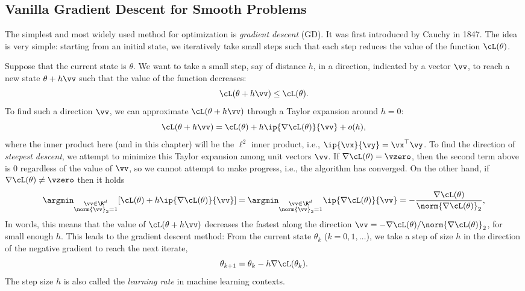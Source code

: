 \documentclass[../../book-main.tex]{subfiles}
\begin{document}
\subsection{Vanilla Gradient Descent for Smooth Problems}

The simplest and most widely used method for optimization is \textit{gradient descent} (GD). It was first introduced by Cauchy in 1847. The idea is very simple: starting from an initial state, we iteratively take small steps such that each step reduces the value of the function $\cL(\theta)$. 

Suppose that the current state is $\theta$. We want to take a small step, say of distance $h$, in a direction, indicated by a vector $\vv$, to reach a new state $\theta + h\vv$ such that the value of the function decreases:
\begin{equation}
    \cL(\theta + h\vv) \leq \cL(\theta).
\end{equation}
To find such a direction $\vv$, we can approximate $\cL(\theta + h\vv)$ through a Taylor expansion around \(h = 0\):
\begin{equation}
    \cL(\theta + h\vv) = \cL(\theta) + h\ip{\nabla \cL(\theta)}{\vv} + o(h),
\end{equation}
where the inner product here (and in this chapter) will be the \(\ell^{2}\) inner product, i.e., \(\ip{\vx}{\vy} = \vx^{\top}\vy\). To find the direction of \textit{steepest descent}, we attempt to minimize this Taylor expansion among unit vectors \(\vv\). If \(\nabla \cL(\theta) = \vzero\), then the second term above is \(0\) regardless of the value of \(\vv\), so we cannot attempt to make progress, i.e., the algorithm has converged. On the other hand, if \(\nabla \cL(\theta) \neq \vzero\) then it holds 
\begin{equation}\label{eq:steepest_descent_l2_norm}
    \argmin_{\substack{\vv \in \R^{d} \\ \norm{\vv}_{2} = 1}} [\cL(\theta) + h\ip{\nabla \cL(\theta)}{\vv}] = \argmin_{\substack{\vv \in \R^{d} \\ \norm{\vv}_{2} = 1}} \ip{\nabla \cL(\theta)}{\vv} = -\frac{\nabla \cL(\theta)}{\norm{\nabla \cL(\theta)}_{2}},
\end{equation}
In words, this means that the value of \(\cL(\theta + h\vv)\) decreases the fastest along the direction \(\vv = -\nabla \cL(\theta) / \norm{\nabla \cL(\theta)}_{2}\), for small enough \(h\). This leads to the gradient descent method: From the current state $\theta_k$ ($k=0, 1, \ldots$), we take a step of size $h$ in the direction of the negative gradient to reach the next iterate,
\begin{equation}
    \theta_{k+1} = \theta_k - h \nabla \cL(\theta_k). 
\end{equation}
The step size \(h\) is also called the \textit{learning rate} in machine learning contexts.
\end{document}
